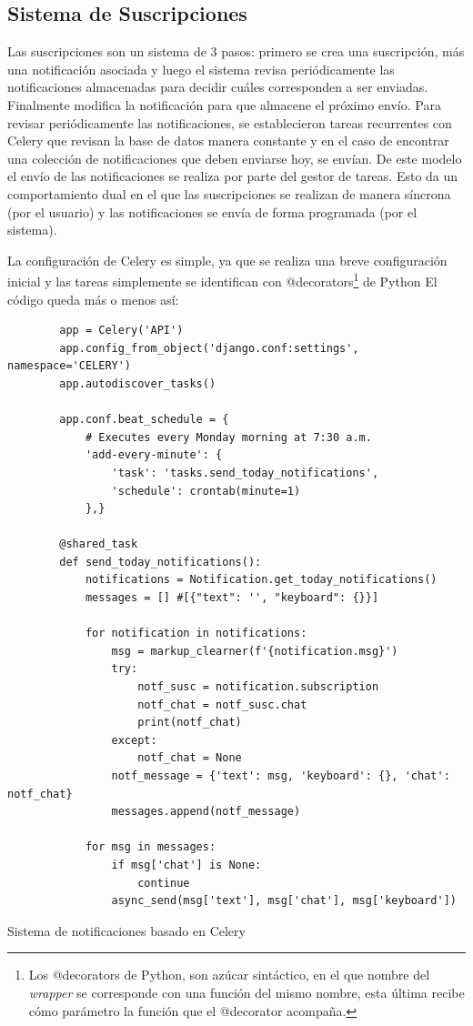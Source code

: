     \subsection{Sistema de Suscripciones}
    \par Las suscripciones son un sistema de 3 pasos: primero se crea una suscripción, más una notificación asociada y luego el sistema revisa periódicamente las notificaciones almacenadas para decidir cuáles corresponden a ser enviadas. Finalmente modifica la notificación para que almacene el próximo envío.
    Para revisar periódicamente las notificaciones, se establecieron tareas recurrentes con \gls{Celery} que revisan la base de datos manera constante y en el caso de encontrar una colección de notificaciones que deben enviarse hoy, se envían. 
    De este modelo el envío de las notificaciones se realiza por parte del gestor de tareas.
    Esto da un comportamiento dual en el que las suscripciones se realizan de manera síncrona (por el usuario) y las notificaciones se envía de forma programada (por el sistema).
    \par La configuración de \gls{Celery} es simple, ya que se realiza una breve configuración inicial y las tareas simplemente se identifican con @decorators\footnote{ Los @decorators de Python, son azúcar sintáctico, en el que nombre del \textit{wrapper} se corresponde con una función del mismo nombre, esta última recibe cómo parámetro la función que el @decorator acompaña.} de Python  
    El código queda más o menos así:
    \begin{listing}
    \begin{verbatim}
        app = Celery('API')
        app.config_from_object('django.conf:settings', namespace='CELERY')
        app.autodiscover_tasks()

        app.conf.beat_schedule = {
            # Executes every Monday morning at 7:30 a.m.
            'add-every-minute': {
                'task': 'tasks.send_today_notifications',
                'schedule': crontab(minute=1)
            },}

        @shared_task
        def send_today_notifications():
            notifications = Notification.get_today_notifications()
            messages = [] #[{"text": '', "keyboard": {}}]
            
            for notification in notifications:
                msg = markup_clearner(f'{notification.msg}')
                try:
                    notf_susc = notification.subscription
                    notf_chat = notf_susc.chat
                    print(notf_chat)
                except:
                    notf_chat = None
                notf_message = {'text': msg, 'keyboard': {}, 'chat': notf_chat}
                messages.append(notf_message)

            for msg in messages:
                if msg['chat'] is None:
                    continue
                async_send(msg['text'], msg['chat'], msg['keyboard'])
    \end{verbatim}
    \caption[Sistema de notificaciones]{Sistema de notificaciones basado en \gls{Celery}}
    \end{listing}

